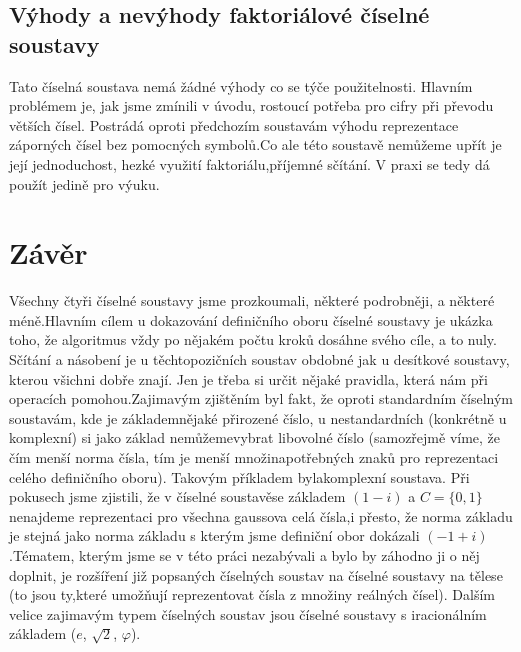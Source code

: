 \documentclass[czech,bachelor,dept470,male]{diploma}
\begin{document}
\subsection{Výhody a nevýhody faktoriálové číselné soustavy} Tato číselná soustava nemá žádné výhody co se týče použitelnosti. Hlavním problémem je, jak jsme zmínili v úvodu, rostoucí potřeba pro cifry při převodu větších čísel. Postrádá oproti předchozím soustavám výhodu reprezentace záporných čísel bez pomocných symbolů.\newline Co ale této soustavě nemůžeme upřít je její jednoduchost, hezké využití faktoriálu,\newline příjemné sčítání. V praxi se tedy dá použít jedině pro výuku.
\section{Závěr}
Všechny čtyři číselné soustavy jsme prozkoumali, některé podrobněji, a některé méně.\newline Hlavním cílem u dokazování definičního oboru číselné soustavy je ukázka toho, že algoritmus vždy po nějakém počtu kroků dosáhne svého cíle, a to nuly. Sčítání a násobení je u těchto\newline pozičních soustav obdobné jak u desítkové soustavy, kterou všichni dobře znají. Jen je třeba si určit nějaké pravidla, která nám při operacích pomohou.\newline\newline Zajimavým zjištěním byl fakt, že oproti standardním číselným soustavám, kde je základem\newline nějaké přirozené číslo, u nestandardních (konkrétně u komplexní) si jako základ nemůžeme\newline vybrat libovolné číslo (samozřejmě víme, že čím menší norma čísla, tím je menší množina\newline potřebných znaků pro reprezentaci celého definičního oboru). Takovým příkladem byla\newline komplexní soustava. Při pokusech jsme zjistili, že v číselné soustavě\newline se základem $(1-i)$ a $C=\{0,1\}$ nenajdeme reprezentaci pro všechna gaussova celá čísla,\newline i přesto, že norma základu je stejná jako norma základu s kterým jsme definiční obor dokázali $(-1+i)$.\newline\newline Tématem, kterým jsme se v této práci nezabývali a bylo by záhodno ji o něj doplnit, je rozšíření již popsaných číselných soustav na číselné soustavy na tělese (to jsou ty,\newline které umožňují reprezentovat čísla z množiny reálných čísel). Dalším velice zajimavým typem číselných soustav jsou číselné soustavy s iracionálním základem ($e$, $\sqrt{2}$, $\varphi$).
\printbibliography[title={Literatura}, heading=bibintoc]
\end{document}
